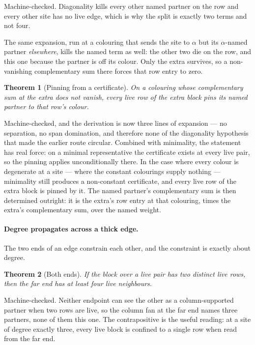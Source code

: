\documentclass[11pt]{article}
\newtheorem{theorem}{Theorem}[section]
\theoremstyle{definition}
\theoremstyle{remark}
\begin{document}
Machine-checked. Diagonality kills every other named partner on the row and every other site
has no live edge, which is why the split is exactly two terms and not four.

The same expansion, run at a colouring that sends the site to $\alpha$ but its
$\alpha$-named partner \emph{elsewhere}, kills the named term as well: the other two die on
the row, and this one because the partner is off its colour. Only the extra survives, so a
non-vanishing complementary sum there forces that row entry to zero.

\begin{theorem}[Pinning from a certificate]\label{thm:certpin}
On a colouring whose complementary sum at the extra does not vanish, every live row of the
extra block pins its named partner to that row's colour.
\end{theorem}

Machine-checked, and the derivation is now three lines of expansion --- no separation, no span
domination, and therefore none of the diagonality hypothesis that made the earlier route
circular. Combined with minimality, the statement has real force: on a minimal representative
the certificate exists at every live pair, so the pinning applies unconditionally there. In
the case where every colour is degenerate at a site --- where the constant colourings supply
nothing --- minimality still produces a non-constant certificate, and every live row of the
extra block is pinned by it. The named partner's complementary sum is then determined
outright: it is the extra's row entry at that colouring, times the extra's complementary sum,
over the named weight.

\paragraph{Degree propagates across a thick edge.} The two ends of an edge constrain each
other, and the constraint is exactly about degree.

\begin{theorem}[Both ends]\label{thm:bothends}
If the block over a live pair has two distinct live rows, then the far end has at least four
live neighbours.
\end{theorem}

Machine-checked. Neither endpoint can see the other as a column-supported partner when two
rows are live, so the column fan at the far end names three partners, none of them this one.
The contrapositive is the useful reading: at a site of degree exactly three, every live block
is confined to a single row when read from the far end.
\end{document}
